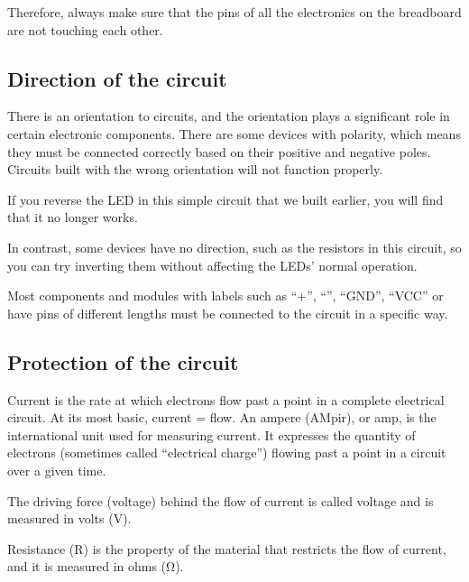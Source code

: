 \documentclass[a4paper,11pt,english]{sphinxmanual}
\begin{document}
\sphinxAtStartPar
Therefore, always make sure that the pins of all the electronics on the breadboard are not touching each other.


\subsection{Direction of the circuit}
\label{\detokenize{Get_Started_with_Arduino/How_to_Build_the_Circuit:direction-of-the-circuit}}
\sphinxAtStartPar
There is an orientation to circuits, and the orientation plays a significant role in certain electronic components. There are some devices with polarity, which means they must be connected correctly based on their positive and negative poles. Circuits built with the wrong orientation will not function properly.




\sphinxAtStartPar
If you reverse the LED in this simple circuit that we built earlier, you will find that it no longer works.

\sphinxAtStartPar
In contrast, some devices have no direction, such as the resistors in this circuit, so you can try inverting them without affecting the LEDs’ normal operation.

\sphinxAtStartPar
Most components and modules with labels such as “+”, “\sphinxhyphen{}”, “GND”, “VCC” or have pins of different lengths must be connected to the circuit in a specific way.


\subsection{Protection of the circuit}
\label{\detokenize{Get_Started_with_Arduino/How_to_Build_the_Circuit:protection-of-the-circuit}}
\sphinxAtStartPar
Current is the rate at which electrons flow past a point in a complete electrical circuit. At its most basic, current = flow. An ampere (AM\sphinxhyphen{}pir), or amp, is the international unit used for measuring current. It expresses the quantity of electrons (sometimes called “electrical charge”) flowing past a point in a circuit over a given time.

\sphinxAtStartPar
The driving force (voltage) behind the flow of current is called voltage and is measured in volts (V).

\sphinxAtStartPar
Resistance (R) is the property of the material that restricts the flow of current, and it is measured in ohms (Ω).
\end{document}
